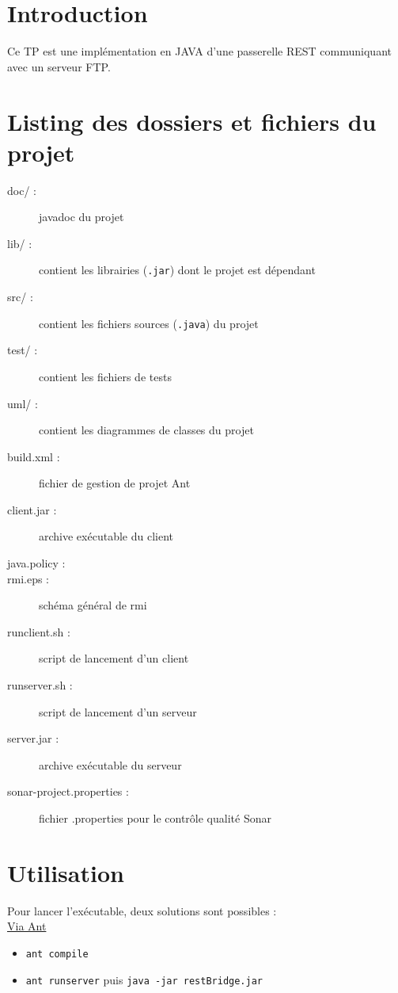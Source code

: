 \section*{Introduction}
Ce TP est une implémentation en JAVA d'une passerelle REST communiquant avec un serveur FTP.

\section*{Listing des dossiers et fichiers du projet}
\begin{description}
	\item[doc/ :] javadoc du projet
	\item[lib/ :] contient les librairies (\verb+.jar+) dont le projet est dépendant
	\item[src/ :] contient les fichiers sources (\verb+.java+) du projet
	\item[test/ :] contient les fichiers de tests
	\item[uml/ :] contient les diagrammes de classes du projet
	\item[build.xml :] fichier de gestion de projet Ant
	\item[client.jar :] archive exécutable du client
	\item[java.policy :]
	\item[rmi.eps :] schéma général de rmi
	\item[runclient.sh :] script de lancement d'un client
	\item[runserver.sh :] script de lancement d'un serveur
	\item[server.jar :] archive exécutable du serveur
	\item[sonar-project.properties :] fichier .properties pour le contrôle qualité Sonar
\end{description}

\section*{Utilisation}
	Pour lancer l'exécutable, deux solutions sont possibles :\\
		\underline{Via Ant}
			\begin{itemize}
				\item \verb+ant compile+
				\item \verb+ant runserver+ puis \verb+java -jar restBridge.jar+ 
			\end{itemize}
		\underline{}

